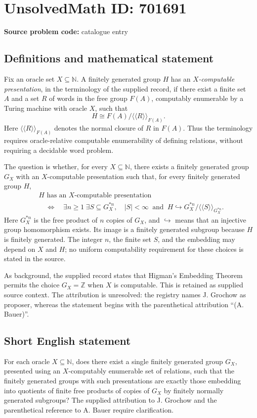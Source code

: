 \documentclass[11pt]{article}
\newcommand{\N}{\mathbb{N}}
\newcommand{\Z}{\mathbb{Z}}
\begin{document}
\section*{UnsolvedMath ID: 701691}
\textbf{Source problem code:} catalogue entry
\subsection{Definitions and mathematical statement}
Fix an oracle set \(X\subseteq\N\). A finitely generated group \(H\) has an \emph{\(X\)-computable presentation}, in the terminology of the supplied record, if there exist a finite set \(A\) and a set \(R\) of words in the free group \(F(A)\), computably enumerable by a Turing machine with oracle \(X\), such that
\[
H\cong F(A)/\langle\!\langle R\rangle\!\rangle_{F(A)}.
\]
Here \(\langle\!\langle R\rangle\!\rangle_{F(A)}\) denotes the normal closure of \(R\) in \(F(A)\). Thus the terminology requires oracle-relative computable enumerability of defining relations, without requiring a decidable word problem.

The question is whether, for every \(X\subseteq\N\), there exists a finitely generated group \(G_X\) with an \(X\)-computable presentation such that, for every finitely generated group \(H\),
\[
\begin{aligned}
&H\text{ has an }X\text{-computable presentation}\\
&\quad\Longleftrightarrow\quad
\exists n\geq 1\;\exists S\subseteq G_X^{*n},\quad
|S|<\infty\ \text{ and }\
H\hookrightarrow G_X^{*n}/\langle\!\langle S\rangle\!\rangle_{G_X^{*n}}.
\end{aligned}
\]
Here \(G_X^{*n}\) is the free product of \(n\) copies of \(G_X\), and \(\hookrightarrow\) means that an injective group homomorphism exists. Its image is a finitely generated subgroup because \(H\) is finitely generated. The integer \(n\), the finite set \(S\), and the embedding may depend on \(X\) and \(H\); no uniform computability requirement for these choices is stated in the source.

As background, the supplied record states that Higman's Embedding Theorem permits the choice \(G_X=\Z\) when \(X\) is computable. This is retained as supplied source context. The attribution is unresolved: the registry names J. Grochow as proposer, whereas the statement begins with the parenthetical attribution ``(A. Bauer)''.
\subsection{Short English statement}
For each oracle \(X\subseteq\N\), does there exist a single finitely generated group \(G_X\), presented using an \(X\)-computably enumerable set of relations, such that the finitely generated groups with such presentations are exactly those embedding into quotients of finite free products of copies of \(G_X\) by finitely normally generated subgroups? The supplied attribution to J. Grochow and the parenthetical reference to A. Bauer require clarification.
\end{document}
